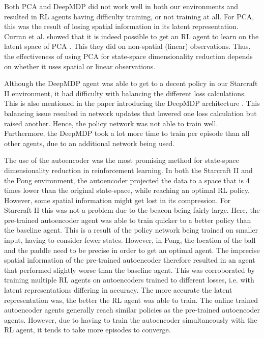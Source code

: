 Both PCA and DeepMDP did not work well in both our environments and resulted in RL agents having difficulty training, or not training at all. For PCA, this was the result of losing spatial information in its latent representation. Curran et al. showed that it is indeed possible to get an RL agent to learn on the latent space of PCA \cite{mario}. This they did on non-spatial (linear) observations. Thus, the effectiveness of using PCA for state-space dimensionality reduction depends on whether it uses spatial or linear observations.

Although the DeepMDP agent was able to get to a decent policy in our Starcraft II environment, it had difficulty with balancing the different loss calculations. This is also mentioned in the paper introducing the DeepMDP architecture \cite{deepmdp}. This balancing issue resulted in network updates that lowered one loss calculation but raised another. Hence, the policy network was not able to train well. Furthermore, the DeepMDP took a lot more time to train per episode than all other agents, due to an additional network being used.

The use of the autoencoder was the most promising method for state-space dimensionality reduction in reinforcement learning. In both the Starcraft II and the Pong environment, the autoencoder projected the data to a space that is 4 times lower than the original state-space, while reaching an optimal RL policy. However, some spatial information might get lost in its compression. For Starcraft II this was not a problem due to the beacon being fairly large. Here, the pre-trained autoencoder agent was able to train quicker to a better policy than the baseline agent. This is a result of the policy network being trained on smaller input, having to consider fewer states. However, in Pong, the location of the ball and the paddle need to be precise in order to get an optimal agent. The imprecise spatial information of the pre-trained autoencoder therefore resulted in an agent that performed slightly worse than the baseline agent. This was corroborated  by training multiple RL agents on autoencoders trained to different losses, i.e. with latent representations differing in accuracy. The more accurate the latent representation was, the better the RL agent was able to train. The online trained autoencoder agents generally reach similar policies as the pre-trained autoencoder agents. However, due to having to train the autoencoder simultaneously with the RL agent, it tends to take more episodes to converge. 

